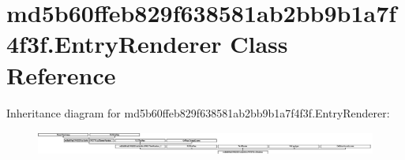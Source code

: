 \hypertarget{classmd5b60ffeb829f638581ab2bb9b1a7f4f3f_1_1EntryRenderer}{}\section{md5b60ffeb829f638581ab2bb9b1a7f4f3f.\+Entry\+Renderer Class Reference}
\label{classmd5b60ffeb829f638581ab2bb9b1a7f4f3f_1_1EntryRenderer}
Inheritance diagram for md5b60ffeb829f638581ab2bb9b1a7f4f3f.\+Entry\+Renderer\+:\begin{figure}[H]
\begin{center}
\leavevmode
\includegraphics[height=0.802005cm]{classmd5b60ffeb829f638581ab2bb9b1a7f4f3f_1_1EntryRenderer}
\end{center}
\end{figure}
